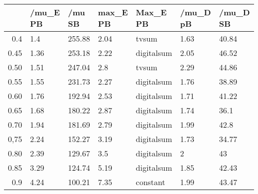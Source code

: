 \begin{table}[ht]
\centering
\begin{tabular}{rllllll}
  \hline
 & /mu\_E PB & /mu SB & max\_E PB & Max\_E PB & /mu\_D pB & /mu\_D SB \\ 
  \hline
0.4 & 1.4 & 255.88 & 2.04 & tvsum & 1.63 & 40.84 \\ 
  0.45 & 1.36 & 253.18 & 2.22 & digitalsum & 2.05 & 46.52 \\ 
  0.50 & 1.51 & 247.04 & 2.8 & tvsum & 2.29 & 44.86 \\ 
  0.55 & 1.55 & 231.73 & 2.27 & digitalsum & 1.76 & 38.89 \\ 
  0.60 & 1.76 & 192.94 & 2.53 & digitalsum & 1.71 & 41.22 \\ 
  0.65 & 1.68 & 180.22 & 2.87 & digitalsum & 1.74 & 36.1 \\ 
  0.70 & 1.94 & 181.69 & 2.79 & digitalsum & 1.99 & 42.8 \\ 
  0,75 & 2.24 & 152.27 & 3.19 & digitalsum & 1.73 & 34.77 \\ 
  0.80 & 2.39 & 129.67 & 3.5 & digitalsum & 2 & 43 \\ 
  0.85 & 3.29 & 124.74 & 5.19 & digitalsum & 1.85 & 42.43 \\ 
  0.9 & 4.24 & 100.21 & 7.35 & constant & 1.99 & 43.47 \\ 
   \hline
\end{tabular}
\end{table}
